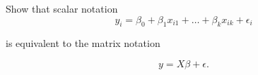 \documentclass[border=3bp]{standalone}
\begin{document}
\begin{minipage}{3.5in}
Show that scalar notation
$$
y_i = \beta_0 + \beta_1 x_{i1} + \dots + \beta_k x_{ik} + \epsilon_i
$$

is equivalent to the matrix notation

$$
y = X\beta + \epsilon.
$$
\end{minipage}
\end{document}
